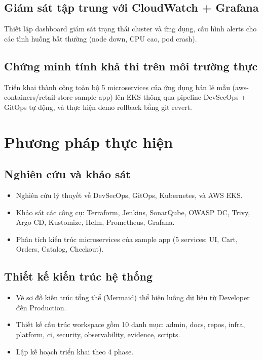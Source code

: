 \documentclass[12pt,a4paper]{article}
\begin{document}
\subsection{Giám sát tập trung với CloudWatch + Grafana}

Thiết lập dashboard giám sát trạng thái cluster và ứng dụng, cấu hình alerts cho các tình huống bất thường (node down, CPU cao, pod crash).

\subsection{Chứng minh tính khả thi trên môi trường thực}

Triển khai thành công toàn bộ 5 microservices của ứng dụng bán lẻ mẫu (aws-containers/retail-store-sample-app) lên EKS thông qua pipeline DevSecOps + GitOps tự động, và thực hiện demo rollback bằng git revert.

\section{Phương pháp thực hiện}

\subsection{Nghiên cứu và khảo sát}
\begin{itemize}[leftmargin=*,nosep]
  \item Nghiên cứu lý thuyết về DevSecOps, GitOps, Kubernetes, và AWS EKS.
  \item Khảo sát các công cụ: Terraform, Jenkins, SonarQube, OWASP DC, Trivy, Argo CD, Kustomize, Helm, Prometheus, Grafana.
  \item Phân tích kiến trúc microservices của sample app (5 services: UI, Cart, Orders, Catalog, Checkout).
\end{itemize}

\subsection{Thiết kế kiến trúc hệ thống}
\begin{itemize}[leftmargin=*,nosep]
  \item Vẽ sơ đồ kiến trúc tổng thể (Mermaid) thể hiện luồng dữ liệu từ Developer đến Production.
  \item Thiết kế cấu trúc workspace gồm 10 danh mục: admin, docs, repos, infra, platform, ci, security, observability, evidence, scripts.
  \item Lập kế hoạch triển khai theo 4 phase.
\end{itemize}
\end{document}
